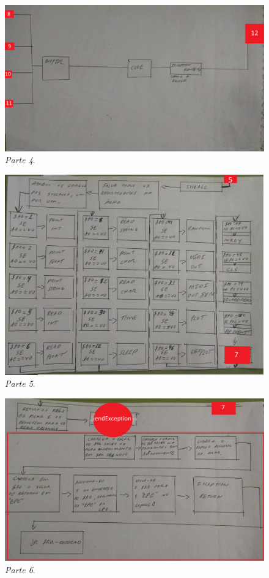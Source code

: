 \documentclass[12pt]{article}
\begin{document}
\begin{figure}[H]
	\centering
	\includegraphics[width=.8\textwidth]{imagens/6.jpg}
	\caption{ \textit{Parte 4}.}
	\label{fig:ex1st}
\end{figure}

\begin{figure}[H]
	\centering
	\includegraphics[width=.8\textwidth]{imagens/3.jpg}
	\caption{ \textit{Parte 5}.}
	\label{fig:ex1st}
\end{figure}

\begin{figure}[H]
	\centering
	\includegraphics[width=.8\textwidth]{imagens/4.jpg}
	\caption{ \textit{Parte 6}.}
	\label{fig:ex1st}
\end{figure}
\end{document}
